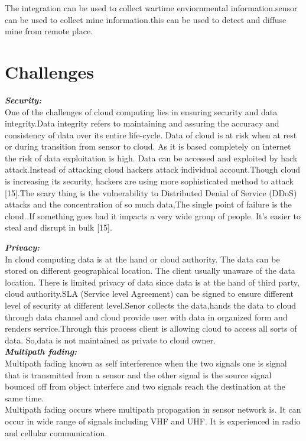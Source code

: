 \documentclass {report}
\begin{document}
	The integration can be used to collect wartime enviornmental information.sensor can be used to collect mine information.this can be used to detect and diffuse mine from remote place.


\chapter{Challenges}

{\bfseries \emph{Security:}\\}  One of the challenges of cloud computing lies in ensuring security and data integrity.Data integrity refers to maintaining and assuring the accuracy and consistency of data over its entire life-cycle. Data of cloud is at risk when at rest or during transition from sensor to cloud. As it is based completely on internet the risk of data exploitation is high. Data can be accessed and exploited by hack attack.Instead of attacking cloud hackers attack individual account.Though cloud is increasing its security, hackers are using more sophisticated method to attack [15].The scary thing is the vulnerability to Distributed Denial of Service (DDoS) attacks and the concentration of so much data,The single point of failure is the cloud. If something goes bad it impacts a very wide group of people. It's easier to steal and disrupt in bulk [15].



{\bfseries \emph{Privacy:}\\}
In cloud computing data is at the hand or cloud authority. The data can be stored on different geographical location. The client usually unaware of the data location. There is limited privacy of data since data is at the hand of third party, cloud authority.SLA (Service level Agreement) can be signed to ensure different level of security at different level.Senor collects the data,hands the data to cloud through data channel and cloud provide user with data in organized form and renders service.Through this process client is allowing cloud to access all sorts of data. So,data is not maintained as private to cloud owner.\\


{\bfseries \emph{Multipath fading:}\\} Multipath fading known as self interference when the two signals one is signal that is transmitted from a sensor and the other signal is the source signal bounced off from object interfere and two signals reach the destination at the same time. \\
Multipath fading occurs where multipath propagation in sensor network is. It can occur in wide range of signals including VHF and UHF. It is experienced in radio and cellular communication.
\end{document}
